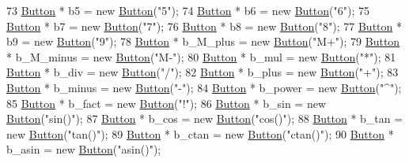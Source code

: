 \begin{DoxyCode}
73     \hyperlink{classButton}{Button} * b5        = \textcolor{keyword}{new}  \hyperlink{classButton}{Button}(\textcolor{stringliteral}{"5"});
74     \hyperlink{classButton}{Button} * b6        = \textcolor{keyword}{new}  \hyperlink{classButton}{Button}(\textcolor{stringliteral}{"6"});
75     \hyperlink{classButton}{Button} * b7        = \textcolor{keyword}{new}  \hyperlink{classButton}{Button}(\textcolor{stringliteral}{"7"});
76     \hyperlink{classButton}{Button} * b8        = \textcolor{keyword}{new}  \hyperlink{classButton}{Button}(\textcolor{stringliteral}{"8"});
77     \hyperlink{classButton}{Button} * b9        = \textcolor{keyword}{new}  \hyperlink{classButton}{Button}(\textcolor{stringliteral}{"9"});
78     \hyperlink{classButton}{Button} * b\_M\_plus  = \textcolor{keyword}{new}  \hyperlink{classButton}{Button}(\textcolor{stringliteral}{"M+"});
79     \hyperlink{classButton}{Button} * b\_M\_minus = \textcolor{keyword}{new}  \hyperlink{classButton}{Button}(\textcolor{stringliteral}{"M-"});
80     \hyperlink{classButton}{Button} * b\_mul     = \textcolor{keyword}{new}  \hyperlink{classButton}{Button}(\textcolor{stringliteral}{"*"});
81     \hyperlink{classButton}{Button} * b\_div     = \textcolor{keyword}{new}  \hyperlink{classButton}{Button}(\textcolor{stringliteral}{"/"});
82     \hyperlink{classButton}{Button} * b\_plus    = \textcolor{keyword}{new}  \hyperlink{classButton}{Button}(\textcolor{stringliteral}{"+"});
83     \hyperlink{classButton}{Button} * b\_minus   = \textcolor{keyword}{new}  \hyperlink{classButton}{Button}(\textcolor{stringliteral}{"-"});
84     \hyperlink{classButton}{Button} * b\_power   = \textcolor{keyword}{new}  \hyperlink{classButton}{Button}(\textcolor{stringliteral}{"^"});
85     \hyperlink{classButton}{Button} * b\_fact    = \textcolor{keyword}{new}  \hyperlink{classButton}{Button}(\textcolor{stringliteral}{"!"});
86     \hyperlink{classButton}{Button} * b\_sin     = \textcolor{keyword}{new}  \hyperlink{classButton}{Button}(\textcolor{stringliteral}{"sin()"});
87     \hyperlink{classButton}{Button} * b\_cos     = \textcolor{keyword}{new}  \hyperlink{classButton}{Button}(\textcolor{stringliteral}{"cos()"});
88     \hyperlink{classButton}{Button} * b\_tan     = \textcolor{keyword}{new}  \hyperlink{classButton}{Button}(\textcolor{stringliteral}{"tan()"});
89     \hyperlink{classButton}{Button} * b\_ctan    = \textcolor{keyword}{new}  \hyperlink{classButton}{Button}(\textcolor{stringliteral}{"ctan()"});
90     \hyperlink{classButton}{Button} * b\_asin    = \textcolor{keyword}{new}  \hyperlink{classButton}{Button}(\textcolor{stringliteral}{"asin()"});

\end{DoxyCode}
